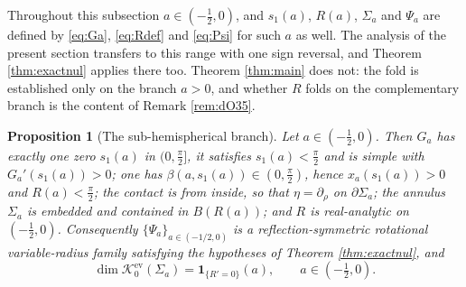 \documentclass[10pt,a4paper]{amsart}
\newtheorem{proposition}[theorem]{Proposition}
\newcommand{\Ker}{\mathcal{K}}
\begin{document}
Throughout this subsection $a\in(-\tfrac12,0)$, and $s_1(a)$, $R(a)$, $\Sigma_a$ and $\Psi_a$ are defined by \eqref{eq:Ga}, \eqref{eq:Rdef} and \eqref{eq:Psi} for such $a$ as well. The analysis of the present section transfers to this range with one sign reversal, and Theorem \ref{thm:exactnul} applies there too. Theorem \ref{thm:main} does not: the fold is established only on the branch $a>0$, and whether $R$ folds on the complementary branch is the content of Remark \ref{rem:dO35}.

\begin{proposition}[The sub-hemispherical branch]\label{prop:subhemi}
Let $a\in(-\tfrac12,0)$. Then $G_a$ has exactly one zero $s_1(a)$ in $(0,\tfrac\pi2]$, it satisfies $s_1(a)<\tfrac\pi2$ and is simple with $G_a'(s_1(a))>0$; one has $\beta(a,s_1(a))\in(0,\tfrac\pi2)$, hence $x_a(s_1(a))>0$ and $R(a)<\tfrac\pi2$; the contact is from inside, so that
$\eta=\partial_\rho$ on $\partial\Sigma_a$; the annulus $\Sigma_a$ is embedded and contained in $B(R(a))$; and $R$ is real-analytic on $(-\tfrac12,0)$.
Consequently $\{\Psi_a\}_{a\in(-1/2,0)}$ is a reflection-symmetric rotational variable-radius family satisfying the hypotheses of Theorem \ref{thm:exactnul}, and
\[
\dim\Ker_0^{\mathrm{ev}}(\Sigma_a)=\mathbf 1_{\{R'=0\}}(a),
\qquad a\in(-\tfrac12,0).
\]
\end{proposition}
\end{document}
